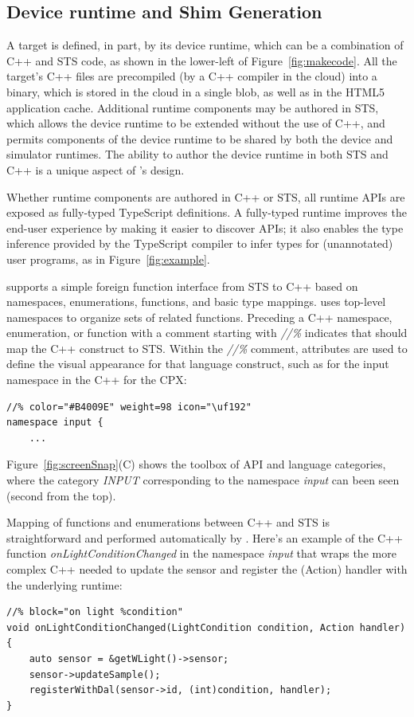 \subsection{Device runtime and Shim Generation}

A \MC target is defined, in part, by its device runtime, which can be a combination of C++
and STS code, as shown in the lower-left of Figure~\ref{fig:makecode}.
All the target's C++ files are precompiled (by a C++ compiler in the cloud)
into a binary, which is stored in the cloud in a single blob, as well as in the HTML5 application cache. Additional runtime
components may be authored in STS, which allows the device runtime to be extended without the
use of C++, and permits components of the device runtime to be shared by both the device
and simulator runtimes. The ability to author the device runtime in both STS and C++ is
a unique aspect of \MCN's design.

Whether runtime components are authored in C++ or STS, all runtime APIs are exposed as fully-typed
TypeScript definitions. A fully-typed runtime improves the end-user experience
by making it easier to discover APIs; it also enables the type inference provided by the TypeScript
compiler to infer types for (unannotated) user programs, as in Figure~\ref{fig:example}.

\MC supports a simple foreign function interface from STS to C++ based on namespaces,
enumerations, functions, and basic type mappings. \MC uses top-level namespaces to organize sets of related functions.  Preceding a C++ namespace, enumeration, or function
with a comment starting with \emph{//\%} indicates that \MC should map the C++ construct to STS.
Within the \emph{//\%} comment, attributes are used to define the visual appearance for that
language construct, such as for the input namespace in the C++ for the CPX:
\begin{lstlisting}
//% color="#B4009E" weight=98 icon="\uf192"
namespace input {
    ...
\end{lstlisting}

Figure~\ref{fig:screenSnap}(C) shows the toolbox of API and language categories, where the
category \emph{INPUT} corresponding to the namespace \emph{input} can been seen (second
from the top).

Mapping of functions and enumerations between C++ and STS is straightforward
and performed automatically by \MC.
Here's an example of the C++ function \emph{onLightConditionChanged}
in the namespace \emph{input} that
wraps the more complex C++ needed to update the sensor and register the (Action)
handler with the underlying \CO runtime:
\begin{lstlisting}
//% block="on light %condition"
void onLightConditionChanged(LightCondition condition, Action handler) {
    auto sensor = &getWLight()->sensor;
    sensor->updateSample();
    registerWithDal(sensor->id, (int)condition, handler);
}
\end{lstlisting}

